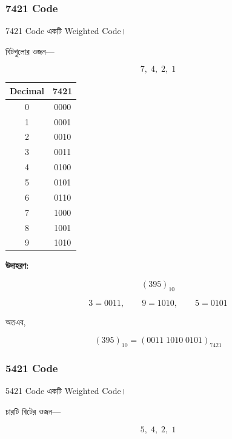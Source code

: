 \subsubsection*{\textenglish{7421 Code}}

\textenglish{7421 Code} একটি
\textenglish{Weighted Code}।

বিটগুলোর ওজন—

\[
\boxed{7,\;4,\;2,\;1}
\]

\begin{center}
\begin{tabular}{|c|c|}
\hline
\rowcolor{ICTLightBlue}
\textbf{\textenglish{Decimal}} &
\textbf{\textenglish{7421}} \\
\hline
0 & 0000 \\ \hline
1 & 0001 \\ \hline
2 & 0010 \\ \hline
3 & 0011 \\ \hline
4 & 0100 \\ \hline
5 & 0101 \\ \hline
6 & 0110 \\ \hline
7 & 1000 \\ \hline
8 & 1001 \\ \hline
9 & 1010 \\ \hline
\end{tabular}
\end{center}

\textbf{\textcolor{ICTOrange}{উদাহরণ:}}

\[
(395)_{10}
\]

\[
3=0011,\qquad
9=1010,\qquad
5=0101
\]

অতএব,

\[
\boxed{
(395)_{10}
=
(0011\;1010\;0101)_{7421}
}
\]


\subsubsection*{\textenglish{5421 Code}}

\textenglish{5421 Code} একটি
\textenglish{Weighted Code}।

চারটি বিটের ওজন—

\[
\boxed{5,\;4,\;2,\;1}
\]


